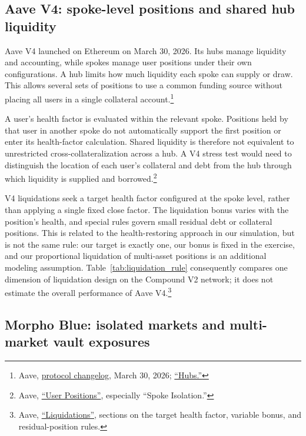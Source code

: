 \documentclass[a4paper,UKenglish,cleveref, autoref, thm-restate]{informs3}
\DeclareRobustCommand{\latestrev}[1]{{\color{red}\hypersetup{linkcolor=red,citecolor=red,urlcolor=red}#1}}
\newenvironment{latestrevisions}{\begingroup\color{red}\hypersetup{linkcolor=red,citecolor=red,urlcolor=red}}{\endgroup}
\begin{document}
\begin{latestrevisions}
\subsection{Aave V4: spoke-level positions and shared hub liquidity}
\label{app:later_protocols_aave4}

Aave V4 launched on Ethereum on March 30, 2026. Its hubs manage liquidity and accounting, while spokes manage user positions under their own configurations. A hub limits how much liquidity each spoke can supply or draw. This allows several sets of positions to use a common funding source without placing all users in a single collateral account.\footnote{\latestrev{Aave, \href{https://aave.com/docs/resources/changelog}{protocol changelog}, March 30, 2026; \href{https://aave.com/docs/aave-v4/liquidity/hubs}{``Hubs.''}}}

A user's health factor is evaluated within the relevant spoke. Positions held by that user in another spoke do not automatically support the first position or enter its health-factor calculation. Shared liquidity is therefore not equivalent to unrestricted cross-collateralization across a hub. A V4 stress test would need to distinguish the location of each user's collateral and debt from the hub through which liquidity is supplied and borrowed.\footnote{\latestrev{Aave, \href{https://aave.com/docs/aave-v4/positions}{``User Positions''}, especially ``Spoke Isolation.''}}

V4 liquidations seek a target health factor configured at the spoke level, rather than applying a single fixed close factor. The liquidation bonus varies with the position's health, and special rules govern small residual debt or collateral positions. This is related to the health-restoring approach in our simulation, but is not the same rule: our target is exactly one, our bonus is fixed in the exercise, and our proportional liquidation of multi-asset positions is an additional modeling assumption. Table~\ref{tab:liquidation_rule} consequently compares one dimension of liquidation design on the Compound V2 network; it does not estimate the overall performance of Aave V4.\footnote{\latestrev{Aave, \href{https://aave.com/docs/aave-v4/positions/liquidations}{``Liquidations''}, sections on the target health factor, variable bonus, and residual-position rules.}}

\subsection{Morpho Blue: isolated markets and multi-market vault exposures}
\label{app:later_protocols_morpho}


\end{latestrevisions}
\end{document}
